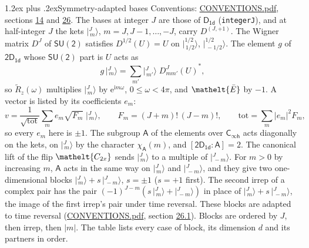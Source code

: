 \documentclass[10pt,a4paper]{article}
\makeatletter
\renewcommand\section{\@startsection{section}{1}{\z@}{-3ex plus -1ex minus -.2ex}%
  {1.2ex plus .2ex}{\normalfont\large\sffamily\bfseries\color{parttitle}}}
\numberwithin{equation}{section}
\newcommand{\eltfont}[1]{{\let\sigma\eltsigma\mathelt{#1}}}
\newcommand{\grp}[1]{\mathsf{#1}}
\newcommand{\elt}[1]{\eltfont{#1}}
\newcommand{\grpindex}[2]{[#1 : #2]}
\newcommand{\iunit}{\mathrm{i}}
\newcommand{\expe}{\mathrm{e}}
\newcommand{\irrJp}[2]{D^{(#1,#2)}}
\newcommand{\wignerD}[1]{D^{#1}}
\newcommand{\chiA}{\chi_{\grp{A}}}
\newcommand{\conj}[1]{{#1}^{*}}
\newcommand{\jm}[2]{\bigl\lvert{}^{#1}_{\,#2}\bigr\rangle}
\newcommand{\barred}[1]{\bar{#1}}
\newcommand{\lift}[1]{\tilde{#1}}
\makeatother
\begin{document}
\section{Symmetry-adapted bases}\label{s:bases}
Conventions: \href{../../CONVENTIONS.pdf}{CONVENTIONS.pdf}, sections \href{../../../rotation/CONVENTIONS.pdf\#conv.14}{14} and \href{../../CONVENTIONS.pdf\#conv.26}{26}.
\leavevmode\label{n:index.m}\label{n:vector.ket}The bases at integer $J$ are those of \href{../../../rotation/data/pdf/D1d.pdf}{$\grp{D_{1d}}$} (\texttt{integerJ}), and at half-integer $J$ the kets $\jm{J}{m}$, $m = J, J-1, \dots, -J$, carry $\irrJp{J}{+1}$. \label{n:matrix.wigner}The Wigner matrix $\wignerD{J}$ of $\grp{SU(2)}$ satisfies $\wignerD{1/2}(U) = U$ on $\jm{1/2}{1/2}$, $\jm{1/2}{-1/2}$. The element $g$ of $\grp{2D_{1d}}$ whose $\grp{SU(2)}$ part is $U$ acts as
\begin{equation}\label{e:action}g\,\jm{J}{m} = \sum_{m'} \jm{J}{m'}\; \conj{\wignerD{J}_{m m'}(U)},\end{equation}
so $\lift{R}_{z}(\omega)$ multiplies $\jm{J}{m}$ by $\expe^{\iunit m\omega}$, $0 \le \omega < 4\pi$, and $\elt{\barred{E}}$ by $-1$. \label{n:index.ketcoefficient}\label{n:vector.basis.symmetry}\label{n:index.ketweight}\label{n:index.total}A vector is listed by its coefficients $e_m$:
\begin{equation}\label{e:ket}v = \frac{1}{\sqrt{\mathrm{tot}}}\sum_m e_m\sqrt{F_m}\;\jm{J}{m},\qquad F_m = (J+m)!\,(J-m)!,\qquad \mathrm{tot} = \sum_m |e_m|^2F_m,\end{equation}
so every $e_m$ here is $\pm 1$.
\leavevmode\label{n:group.A}\label{n:function.character.abelian}The subgroup $\grp{A}$ of the elements over $\grp{C_{\infty h}}$ acts diagonally on the kets, on $\jm{J}{m}$ by the character $\chiA(m)$, and $\grpindex{\grp{2D_{1d}}}{\grp{A}} = 2$. The canonical lift of the flip $\elt{C_{2x}}$ sends $\jm{J}{m}$ to a multiple of $\jm{J}{-m}$. \label{n:index.pair.sign}For $m > 0$ by increasing $m$, $\grp{A}$ acts in the same way on $\jm{J}{m}$ and $\jm{J}{-m}$, and they give two one-dimensional blocks $\jm{J}{m} + s\,\jm{J}{-m}$, $s = \pm 1$ ($s = +1$ first). The second irrep of a complex pair has the pair $(-1)^{J-m}(s\,\jm{J}{m} + \jm{J}{-m})$ in place of $\jm{J}{m} + s\,\jm{J}{-m}$, the image of the first irrep's pair under time reversal. These blocks are adapted to time reversal (\href{../../CONVENTIONS.pdf}{CONVENTIONS.pdf}, section \href{../../CONVENTIONS.pdf\#conv.26.1}{26.1}). Blocks are ordered by $J$, then irrep, then $|m|$.
\leavevmode\label{n:head.case}\label{n:head.partners}The table lists every case of block, its dimension $d$ and its partners in order.
\end{document}
